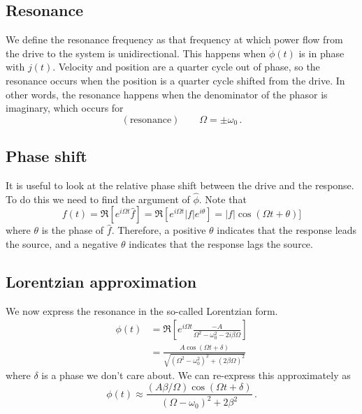 \documentclass{article}
\begin{document}
\subsection{Resonance}

We define the resonance frequency as that frequency at which power flow from the drive to the system is unidirectional.
This happens when $\dot{\phi}(t)$ is in phase with $j(t)$.
Velocity and position are a quarter cycle out of phase, so the resonance occurs when the position is a quarter cycle shifted from the drive.
In other words, the resonance happens when the denominator of the phasor is imaginary, which occurs for
\begin{equation}
(\text{resonance}) \qquad \Omega = \pm \omega_0 \, .
\end{equation}

\subsection{Phase shift}

It is useful to look at the relative phase shift between the drive and the response.
To do this we need to find the argument of $\hat{\phi}$.
Note that
\begin{equation}
f(t)
= \Re[e^{i \Omega t}\hat{f}]
= \Re[e^{i \Omega t}|f|e^{i\theta}]
=|f|\cos(\Omega t + \theta)]
\end{equation}
where $\theta$ is the phase of $\hat{f}$.
Therefore, a positive $\theta$ indicates that the response leads the source, and a negative $\theta$ indicates that the response lags the source.

\subsection{Lorentzian approximation}

We now express the resonance in the so-called Lorentzian form.
\begin{align}
\phi(t)
&= \Re \left[ e^{i\Omega t} \frac{-A}{\Omega^2 - \omega_0^2 - 2i\beta \Omega} \right] \nonumber \\
&= \frac{A \cos \left( \Omega t + \delta \right)}{\sqrt{\left( \Omega^2 - \omega_0^2 \right)^2 + (2 \beta \Omega)^2}}
\end{align}
where $\delta$ is a phase we don't care about.
We can re-express this approximately as
\begin{equation}
\phi(t) \approx \frac{(A \beta / \Omega) \cos(\Omega t + \delta)}{\left( \Omega - \omega_0 \right)^2 + 2\beta^2} \, .
\end{equation}
\end{document}
